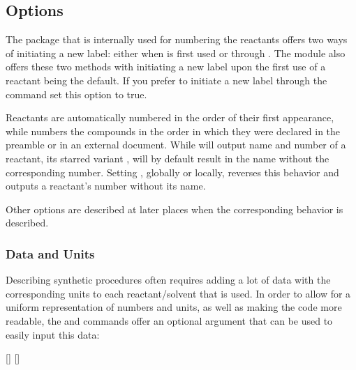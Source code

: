\documentclass{chemmacros-manual}
\begin{document}
\subsection{Options}
\begin{options}
    The  package that is internally used for numbering the
    reactants offers two ways of initiating a new label: either when 
    is first used or through .  The  module
    also offers these two methods with initiating a new label upon the first
    use of a reactant being the default.   If you prefer to initiate a
    new label through the  command set this option to
    true.

    Reactants are automatically numbered in the order of their first
    appearance, while  numbers the compounds in the order in
    which they were declared in the preamble or in an external document.
    While  will output name and number of a reactant, its
    starred variant , will by default result in the name without
    the corresponding number. Setting , globally or
    locally, reverses this behavior and outputs a reactant's number without
    its name.
\end{options}
Other options are described at later places when the corresponding behavior is
described.

\subsubsection{Data and Units}

Describing synthetic procedures often requires adding a lot of data with the
corresponding units to each reactant/solvent that is used. In order to allow
for a uniform representation of numbers and units, as well as making the code
more readable, the  and  commands offer an optional
argument that can be used to easily input this data:

\begin{commands}
  []
  []
\end{commands}
\end{document}
